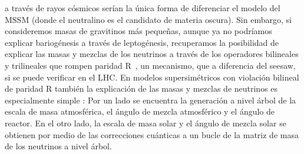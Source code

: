 a través de rayos cósmicos serían la única forma de diferenciar el
modelo del MSSM (donde el neutralino es el candidato de materia
oscura). Sin embargo, si consideremos masas de gravitinos más
pequeñas, aunque ya no podríamos explicar bariogénesis a través de
leptogénesis, recuperamos la posibilidad de explicar las masas y
mezclas de los neutrinos a través de los operadores bilineales y
trilineales que rompen paridad R~\cite{Hirsch:2005ag}, un mecanismo,
que a diferencia del seesaw, si se puede verificar en el LHC.
En modelos supersimétricos con violación bilineal de paridad R también
la explicación de las masas y mezclas de neutrinos es especialmente
simple \cite{Hirsch:2000ef,Diaz:2003as,Hirsch:2004he,Hirsch:2008ur}: Por un lado se encuentra la
generación a nivel árbol de la escala de masa atmosférica, el ángulo
de mezcla atmosférico y el ángulo de reactor. En el otro lado, la
escala de masa solar y el ángulo de mezcla solar se obtienen por medio
de las correcciones cuánticas a un bucle de la matriz de masa de los
neutrinos a nivel árbol.

